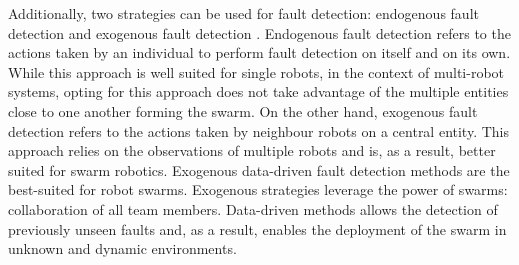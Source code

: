 Additionally, two strategies can be used for fault detection: endogenous fault detection and exogenous fault detection \cite{christensen2008fault, lau2012error, Miller2021modern}. Endogenous fault detection refers to the actions taken by an individual to perform fault detection on itself and on its own. While this approach is well suited for single robots, in the context of multi-robot systems, opting for this approach does not take advantage of the multiple entities close to one another forming the swarm. On the other hand, exogenous fault detection refers to the actions taken by neighbour robots on a central entity. This approach relies on the observations of multiple robots and is, as a result, better suited for swarm robotics. Exogenous data-driven fault detection methods are the best-suited for robot swarms. Exogenous strategies leverage the power of swarms: collaboration of all team members. Data-driven methods allows the detection of previously unseen faults and, as a result, enables the deployment of the swarm in unknown and dynamic environments.



